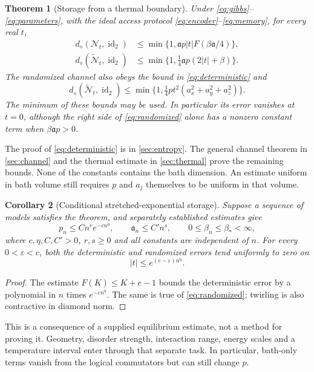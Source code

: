 \documentclass[11pt,reqno]{amsart}
\numberwithin{equation}{section}
\newtheorem{theorem}{Theorem}[section]
\newtheorem{corollary}[theorem]{Corollary}
\theoremstyle{definition}
\theoremstyle{remark}
\newcommand{\id}{\operatorname{id}}
\newcommand{\Ncal}{\mathcal N}
\newcommand{\diam}{d_\diamond}
\newcommand{\pa}{\mathfrak a}
\begin{document}
\begin{theorem}[Storage from a thermal boundary]\label{thm:main}
Under \eqref{eq:gibbs}--\eqref{eq:parameters}, with the ideal access protocol
\eqref{eq:encoder}--\eqref{eq:memory}, for every real \(t\),
\begin{align}
 \diam(\Ncal_t,\id_2)
 &\le \min\{1,\pa p|t|F(\beta\pa/4)\},                 \label{eq:deterministic}\\
 \diam(\widetilde{\Ncal}_t,\id_2)
 &\le \min\{1,\tfrac14\pa p(2|t|+\beta)\}.            \label{eq:randomized}
\end{align}
The randomized channel also obeys the bound in \eqref{eq:deterministic} and
\begin{equation}\label{eq:quadratic-main}
 \diam(\widetilde{\Ncal}_t,\id_2)
 \le \min\{1,\tfrac14pt^2(a_x^2+a_y^2+a_z^2)\}.
\end{equation}
The minimum of these bounds may be used. In particular its error vanishes
at \(t=0\), although the right side of \eqref{eq:randomized} alone
has a nonzero constant term when \(\beta\pa p>0\).
\end{theorem}

The proof of \eqref{eq:deterministic} is in \cref{sec:entropy}.
The general channel theorem in \cref{sec:channel} and the thermal estimate
in \cref{sec:thermal} prove the remaining bounds. None of the constants
contains the bath dimension. An estimate uniform in bath volume still
requires \(p\) and \(a_j\) themselves to be uniform in that volume.

\begin{corollary}[Conditional stretched-exponential storage]\label{cor:asymptotic}
Suppose a sequence of models satisfies the theorem, and separately
established estimates give
\[
 p_n\le Cn^r e^{-c n^\eta},\qquad
 \pa_n\le C'n^s,\qquad 0\le\beta_n\le\beta_*<\infty,
\]
where \(c,\eta,C,C'>0\), \(r,s\ge0\) and all constants are independent
of \(n\). For every \(0<\varepsilon<c\), both the deterministic and
randomized errors tend uniformly to zero on
\[
                  |t|\le e^{(c-\varepsilon)n^\eta}.
\]
\end{corollary}
\begin{proof}
The estimate \(F(K)\le K+e-1\) bounds the deterministic error by a polynomial
in \(n\) times \(e^{-\varepsilon n^\eta}\). The same is true of
\eqref{eq:randomized}; twirling is also contractive in diamond norm.
\end{proof}

This is a consequence of a supplied equilibrium estimate, not a method for
proving it. Geometry, disorder strength, interaction range, energy scales
and a temperature interval enter through that separate task. In
particular, bath-only terms vanish from the logical commutators but can
still change \(p\).
\end{document}
